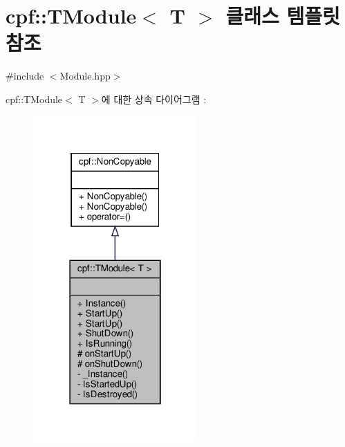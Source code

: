 \hypertarget{classcpf_1_1_t_module}{}\section{cpf\+:\+:T\+Module$<$ T $>$ 클래스 템플릿 참조}
\label{classcpf_1_1_t_module}


{\ttfamily \#include $<$Module.\+hpp$>$}



cpf\+:\+:T\+Module$<$ T $>$에 대한 상속 다이어그램 \+: \nopagebreak
\begin{figure}[H]
\begin{center}
\leavevmode
\includegraphics[width=178pt]{classcpf_1_1_t_module__inherit__graph}
\end{center}
\end{figure}


